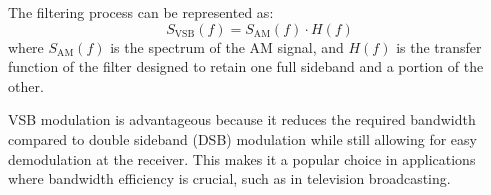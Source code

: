 The filtering process can be represented as:
\[
S_{\text{VSB}}(f) = S_{\text{AM}}(f) \cdot H(f)
\]
where \( S_{\text{AM}}(f) \) is the spectrum of the AM signal, and \( H(f) \) is the transfer function of the filter designed to retain one full sideband and a portion of the other.

VSB modulation is advantageous because it reduces the required bandwidth compared to double sideband (DSB) modulation while still allowing for easy demodulation at the receiver. This makes it a popular choice in applications where bandwidth efficiency is crucial, such as in television broadcasting.

